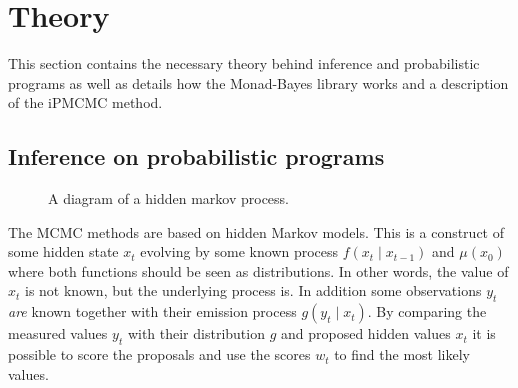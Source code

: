 \section{Theory}

This section contains the necessary theory behind inference and probabilistic programs as well as details how the Monad-Bayes library works and a description of the iPMCMC method.

\subsection{Inference on probabilistic programs}
\label{sub:inference_on_probabilistic_programs}

\begin{figure}[h!]
\begin{center}
\end{center}
\caption{A diagram of a hidden markov process.}
\label{fig:hmm}
\end{figure}

The MCMC methods are based on hidden Markov models. This is a construct of some hidden state $x_t$ evolving by some known process $f(x_t \mid x_{t-1})$ and $\mu(x_0)$ where both functions should be seen as distributions. In other words, the value of $x_t$ is not known, but the underlying process is. In addition some observations $y_t$ \emph{are} known together with their emission process $g(y_t \mid x_t)$. By comparing the measured values $y_t$ with their distribution $g$ and proposed hidden values $x_t$ it is possible to score the proposals and use the scores $w_t$ to find the most likely values.

